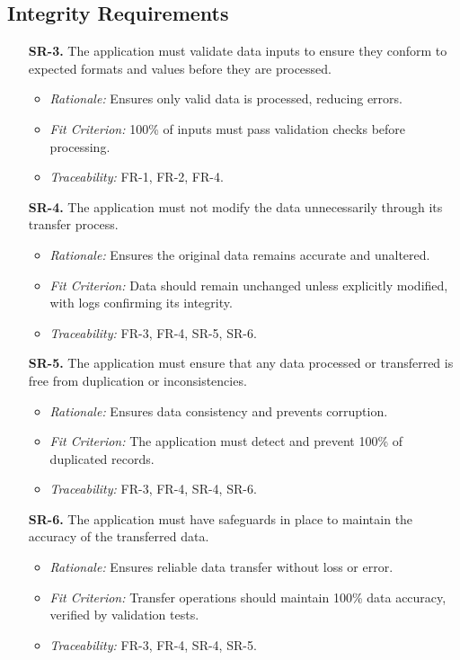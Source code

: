 \documentclass[12pt]{article}
\begin{document}
\subsection{Integrity Requirements}
\begin{enumerate}
  \item[\textbf{SR-3.}] The application must validate data inputs to ensure they
  conform to expected formats and values before they are processed.
  \begin{itemize}
    \item \textit{Rationale:} Ensures only valid data is processed, reducing
    errors.
    \item \textit{Fit Criterion:} 100\% of inputs must pass validation checks
    before processing.
    \item \textit{Traceability:} FR-1, FR-2, FR-4.
  \end{itemize}

  \item[\textbf{SR-4.}] The application must not modify the data unnecessarily
  through its transfer process.
  \begin{itemize}
    \item \textit{Rationale:} Ensures the original data remains accurate and
    unaltered.
    \item \textit{Fit Criterion:} Data should remain unchanged unless explicitly
    modified, with logs confirming its integrity.
    \item \textit{Traceability:} FR-3, FR-4, SR-5, SR-6.
  \end{itemize}

  \item[\textbf{SR-5.}] The application must ensure that any data processed or
  transferred is free from duplication or inconsistencies.
  \begin{itemize}
    \item \textit{Rationale:} Ensures data consistency and prevents corruption.
    \item \textit{Fit Criterion:} The application must detect and prevent 100\%
    of duplicated records.
    \item \textit{Traceability:} FR-3, FR-4, SR-4, SR-6.
  \end{itemize}

  \item[\textbf{SR-6.}] The application must have safeguards in place to
  maintain the accuracy of the transferred data.
  \begin{itemize}
    \item \textit{Rationale:} Ensures reliable data transfer without loss or
    error.
    \item \textit{Fit Criterion:} Transfer operations should maintain 100\% data
    accuracy, verified by validation tests.
    \item \textit{Traceability:} FR-3, FR-4, SR-4, SR-5.
  \end{itemize}
\end{enumerate}
\end{document}
